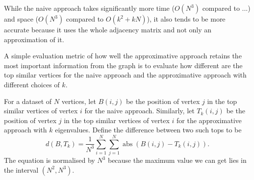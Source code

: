 \documentclass[12pt]{report}
\begin{document}
While the naive approach takes significantly more time ($O(N^3)$ compared to
...) and space ($O(N^3)$ compared to $O(k^2 + kN)$), it also tends
to be more accurate because it uses the whole adjacency matrix and not only an
approximation of it.

A simple evaluation metric of how well the approximative approach retains the
most important information from the graph is to evaluate how different are the
top similar vertices for the naive approach and the approximative approach
with different choices of $k$.


For a dataset of $N$ vertices, let $B(i,j)$ be the position of vertex $j$ in
the top similar vertices of vertex $i$ for the naive approach. Similarly, let
$T_k(i,j)$ be the position of vertex $j$ in the top similar vertices of vertex
$i$ for the approximative approach with $k$ eigenvalues. Define the difference
between two such tops to be
\begin{equation}
  d(B, T_k) = \frac{1}{N^3}
    \sum_{i=1}^N \sum_{j=1}^N \operatorname{abs}(B(i,j) - T_k(i,j)).
\end{equation}
The equation is normalised by $N^3$ because the maximum value we can get lies in
the interval $(N^2, N^3)$.
%
\end{document}
